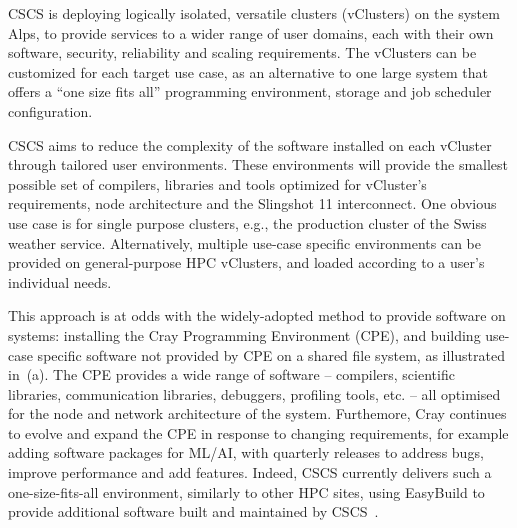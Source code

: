 CSCS is deploying logically isolated, versatile clusters (vClusters) on the \crayex system Alps, to provide services to a wider range of user domains, each with their own software, security, reliability and scaling requirements.
The vClusters can be customized for each target use case, as an alternative to one large system that offers a ``one size fits all'' programming environment, storage and job scheduler configuration.

CSCS aims to reduce the complexity of the software installed on each vCluster through tailored user environments.
These environments will provide the smallest possible set of compilers, libraries and tools optimized for vCluster's requirements, node architecture and the Slingshot 11 interconnect.
One obvious use case is for single purpose clusters, e.g., the production cluster of the Swiss weather service.
Alternatively, multiple use-case specific environments can be provided on general-purpose HPC vClusters, and loaded according to a user's individual needs.

This approach is at odds with the widely-adopted method to provide software on \crayex systems: installing the Cray Programming Environment (CPE), and building use-case specific software not provided by CPE on a shared file system, as illustrated in~(a).
The CPE provides a wide range of software -- compilers, scientific libraries, communication libraries, debuggers, profiling tools, etc. -- all optimised for the node and network architecture of the system.
Furthemore, Cray continues to evolve and expand the CPE in response to changing requirements, for example adding software packages for ML/AI, with quarterly releases to address bugs, improve performance and add features.
Indeed, CSCS currently delivers such a one-size-fits-all environment, similarly to other HPC sites, using EasyBuild to provide additional software built and maintained by CSCS~\cite{forai:cug16}.

